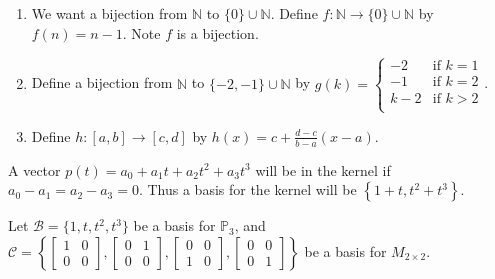 \documentclass[12pt,letterpaper]{article}
\begin{document}
\begin{enumerate}
\begin{enumerate}
  \item We want a bijection from $\mathbb{N}$ to $\{ 0\} \cup \mathbb{N}$. Define $f: \mathbb{N} \to \{0\}\cup \mathbb{N}$ by $f(n)=n-1$. Note $f$ is a bijection.
  
  \item Define a bijection from $\mathbb{N}$ to $\{-2, -1\}\cup \mathbb{N}$ by $g(k)=\begin{cases}
  -2 & \text{if } k=1\\
    -1 & \text{if } k=2\\
     k-2 & \text{if } k>2\\
  \end{cases}$.

 \item  Define $h: [a,b] \to [c,d]$ by $h(x)= c+ \frac{d-c}{b-a}(x-a)$. 
  \end{enumerate}

\Answer 			A vector $p(t) = a_0 + a_1 t + a_2 t^2 + a_3 t^3$ will be in the kernel if $a_0 - a_1 = a_2 - a_3 = 0$.
				Thus a basis for the kernel will be 
					$\left\{ 1+t, t^2+t^3 \right\}$.
					
					Let $\mathcal{B} = \{ 1,t,t^2,t^3\}$ be a basis for $\mathbb{P}_3$, and $\mathcal{C} = \left\{ \begin{bmatrix} 1 & 0 \\ 0 & 0 \end{bmatrix},\begin{bmatrix} 0 & 1 \\ 0 & 0 \end{bmatrix}, \begin{bmatrix} 0 & 0 \\ 1 & 0 \end{bmatrix}, \begin{bmatrix} 0 & 0 \\ 0 & 1 \end{bmatrix} \right\}$
			be a basis for $M_{2 \times 2}$.
			

\end{enumerate}
\end{document}
